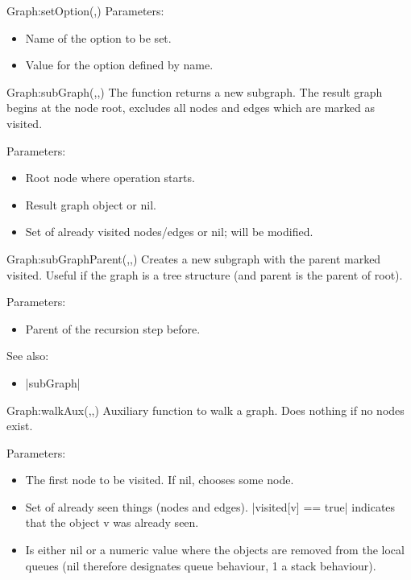 \begin{luacommand}{{Graph:setOption}(,)}
Parameters:
\begin{itemize}
	\item[]  \subitem Name of the option to be set.\item[]  \subitem Value for the option defined by name.
\end{itemize}



\end{luacommand}\begin{luacommand}{{Graph:subGraph}(,,)}
The function returns a new subgraph. The result graph begins at the node root, excludes all nodes and edges which are marked as visited.

Parameters:
\begin{itemize}
	\item[]  \subitem Root node where operation starts.\item[]  \subitem Result graph object or nil.\item[]  \subitem Set of already visited nodes/edges or nil; will be modified.
\end{itemize}



\end{luacommand}\begin{luacommand}{{Graph:subGraphParent}(,,)}
Creates a new subgraph with the parent marked visited. Useful if the graph is a tree structure (and parent is the parent of root).

Parameters:
\begin{itemize}
	\item[]  \subitem Parent of the recursion step before.
\end{itemize}



See also:
\begin{itemize}
	\item[] |subGraph|
\end{itemize}

\end{luacommand}\begin{luacommand}{{Graph:walkAux}(,,)}
Auxiliary function to walk a graph. Does nothing if no nodes exist.

Parameters:
\begin{itemize}
	\item[]  \subitem The first node to be visited.  If nil, chooses some node.\item[]  \subitem Set of already seen things (nodes and edges). |visited[v] == true| indicates that the object v was already seen.\item[]  \subitem Is either nil or a numeric value where the objects are removed from the local queues (nil therefore designates queue behaviour, 1 a stack behaviour).
\end{itemize}




\end{luacommand}
